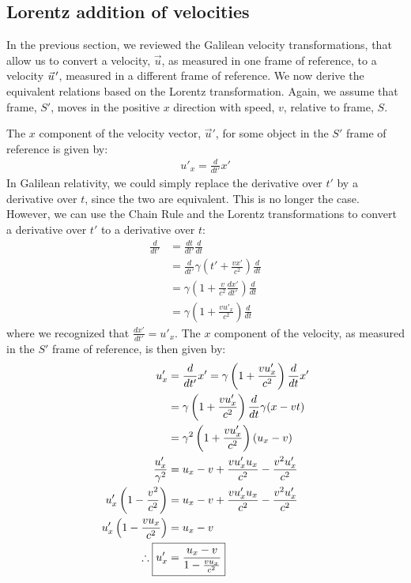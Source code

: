 \subsection{Lorentz addition of velocities}
In the previous section, we reviewed the Galilean velocity transformations, that allow us to convert a velocity, $\vec u$, as measured in one frame of reference, to a velocity $\pvec u'$, measured in a different frame of reference. We now derive the equivalent relations based on the Lorentz transformation. Again, we assume that frame, $S'$, moves in the positive $x$ direction with speed, $v$, relative to frame, $S$. 

The $x$ component of the velocity vector, $\vec u'$, for some object in the $S'$ frame of reference is given by:
\begin{align*}
u'_x = \frac{d}{dt'} x'
\end{align*}
In Galilean relativity, we could simply replace the derivative over $t'$ by a derivative over $t$, since the two are equivalent. This is no longer the case. However, we can use the Chain Rule and the Lorentz transformations to convert a derivative over $t'$ to a derivative over $t$:
\begin{align*}
\frac{d}{dt'} &= \frac{dt}{dt'}\frac{d}{dt}\\
&= \frac{d}{dt'} \gamma\left(t'+\frac{vx'}{c^2} \right)\frac{d}{dt}\\
&=\gamma \left(1+\frac{v}{c^2}\frac{dx'}{dt'}\right)\frac{d}{dt}\\
&=\gamma \left(1+\frac{vu'_x}{c^2}\right)\frac{d}{dt}
\end{align*}
where we recognized that $\frac{dx'}{dt'}=u'_x$. The $x$ component of the velocity, as measured in the $S'$ frame of reference, is then given by:
\begin{align*}
u'_x &= \frac{d}{dt'} x' = \gamma \left(1+\frac{vu'_x}{c^2}\right)\frac{d}{dt}x'\\
&=\gamma \left(1+\frac{vu'_x}{c^2}\right)\frac{d}{dt}\gamma (x-vt)\\
&=\gamma^2 \left(1+\frac{vu'_x}{c^2}\right)(u_x -v)\\
\frac{u'_x}{\gamma^2}&=u_x -v +\frac{vu'_xu_x}{c^2}-\frac{v^2u'_x}{c^2}\\
u'_x\left (1-\frac{v^2}{c^2}\right)&=u_x -v +\frac{vu'_xu_x}{c^2}-\frac{v^2u'_x}{c^2}\\
u'_x \left( 1- \frac{vu_x}{c^2}\right) &=u_x -v\\
\therefore \; \Aboxed{u'_x&=\frac{u_x -v}{1- \frac{vu_x}{c^2}}}
\end{align*}

